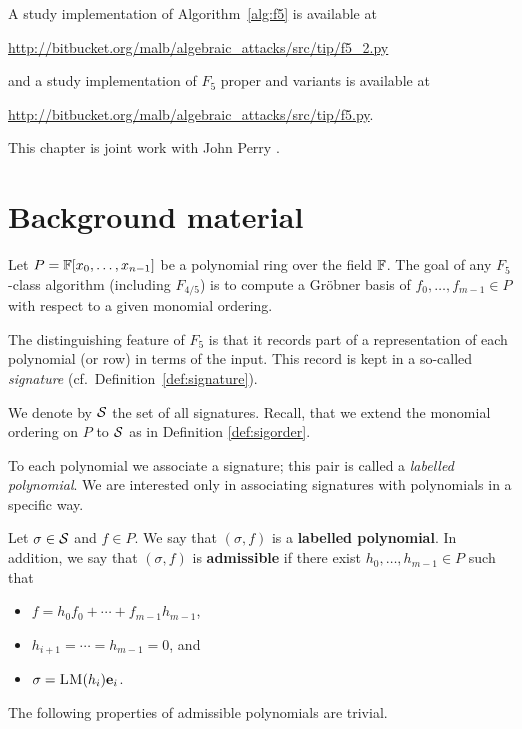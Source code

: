 A study implementation of Algorithm~\ref{alg:f5} is available at
\begin{center}
\url{http://bitbucket.org/malb/algebraic_attacks/src/tip/f5_2.py}
\end{center}
and a study implementation of $F_5$ proper and variants is available at
\begin{center}
\url{http://bitbucket.org/malb/algebraic_attacks/src/tip/f5.py}.
\end{center}

This chapter is joint work with John Perry \cite{albrecht-perry:f45}.

\section{Background material}\label{sec:background}

Let $P = \mathbb{F}[x_0,\ldots,x_{n-1}]$ be a polynomial ring over the field $\mathbb{F}$. The goal of any $F_5$-class algorithm (including $F_{4/5}$)
is to compute a Gr\"obner basis of $f_0,\ldots,f_{m-1}\in P$ with respect to a given monomial ordering.

The distinguishing feature of $F_5$ is that it records part of a representation of each polynomial (or row) in terms of the input. This record is kept in a so-called \emph{signature} (cf.\ Definition\ \ref{def:signature}).

We denote by $\mathcal{S}$ the set of all signatures. Recall, that we extend the monomial ordering on $P$ to $\mathcal{S}$ as in Definition \ref{def:sigorder}.

To each polynomial we associate a signature; this pair is called a \emph{labelled polynomial}. We are interested only in associating signatures with polynomials in a specific way.

\begin{definition}
Let $\sigma\in\mathcal{S}$ and $f\in P$. We say that $(\sigma,f)$ is a
\textbf{labelled polynomial}. In addition, we say that $(\sigma,f)$ is \textbf{admissible} if there exist $h_0,\ldots,h_{m-1}\in P$
such that
\begin{itemize}
\item $f=h_0 f_0 + \cdots + f_{m-1} h_{m-1}$,
\item $h_{i+1} = \cdots = h_{m-1} = 0$, and
\item $\sigma = \textsc{LM}(h_i) \mathbf{e}_i$.
\end{itemize}
\end{definition}

The following properties of admissible polynomials are trivial.

